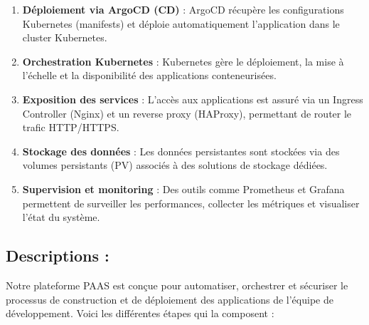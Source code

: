 \begin{enumerate}
    \item \textbf{Déploiement via ArgoCD (CD)} :  
    ArgoCD récupère les configurations Kubernetes (manifests) et déploie automatiquement l’application dans le cluster Kubernetes.

    \item \textbf{Orchestration Kubernetes} :  
    Kubernetes gère le déploiement, la mise à l’échelle et la disponibilité des applications conteneurisées.

    \item \textbf{Exposition des services} :  
    L’accès aux applications est assuré via un Ingress Controller (Nginx) et un reverse proxy (HAProxy), permettant de router le trafic HTTP/HTTPS.

    \item \textbf{Stockage des données} :  
    Les données persistantes sont stockées via des volumes persistants (PV) associés à des solutions de stockage dédiées.

    \item \textbf{Supervision et monitoring} :  
    Des outils comme Prometheus et Grafana permettent de surveiller les performances, collecter les métriques et visualiser l’état du système.

\end{enumerate}

\subsection{Descriptions :}

Notre plateforme PAAS est conçue pour automatiser, orchestrer et sécuriser le processus de construction et de déploiement des applications de l’équipe de développement. Voici les différentes étapes qui la composent :

